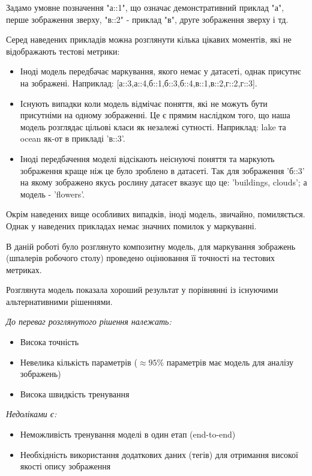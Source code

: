 \documentclass{udstu}
\begin{document}
Задамо умовне позначення "а::1", що означає демонстративний приклад "а", перше зображення зверху,
"в::2" - приклад "в", друге зображення зверху і тд.

Серед наведених прикладів можна розглянути кілька цікавих моментів, які не відображають тестові метрики:

\begin{itemize}[*]
	\item Іноді модель передбачає маркування, якого немає у датасеті, однак присутнє на зображені.
	Наприклад: [а::3,а::4,б::1,б::3,б::4,в::1,в::2,г::2,г::3].
	\item Існують випадки коли модель відмічає поняття, які не можуть бути присутніми на одному зображенні.
	Це є прямим наслідком того, що наша модель розглядає цільові класи як незалежі сутності.
	Наприклад: lake та ocean як-от в прикладі 'в::3'.
	\item Іноді передбачення моделі відсікають неіснуючі поняття та маркують зображення краще ніж це
	було зроблено в датасеті. Так для зображення 'б::3' на якому зображено якусь рослину датасет
	вказує що це: 'buildings, clouds'; а модель - 'flowers'.
\end{itemize}

Окрім наведених вище особливих випадків, іноді модель, звичайно, помиляється. Однак у наведених
прикладах немає значних помилок у маркуванні.

\conclusions

В даній роботі було розглянуто композитну модель, для маркування зображень (шпалерів робочого столу)
проведено оцінювання її точності на тестових метриках.

Розглянута модель показала хороший результат у порівнянні із існуючими альтернативними рішеннями.

\textit{До переваг розглянутого рішення належать:}

\begin{itemize}[+]
	\item Висока точність
	\item Невелика кількість параметрів ($\approx 95\%$ параметрів має модель для аналізу зображень)
	\item Висока швидкість тренування
\end{itemize}

\textit{Недоліками є:}

\begin{itemize}[-]
	\item Неможливість тренування моделі в один етап (end-to-end)
	\item Необхідність використання додаткових даних (тегів) для
	отримання високої якості опису зображення
\end{itemize}
\end{document}
